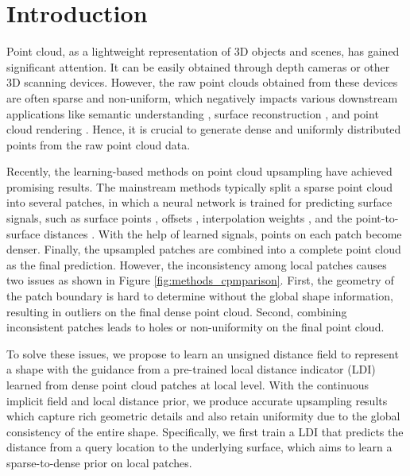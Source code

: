 \documentclass[letterpaper]{article} %
\begin{document}
\section{Introduction}
Point cloud, as a lightweight representation of 3D objects and scenes, has gained significant attention. It can be easily obtained through depth cameras or other 3D scanning devices. However, the raw point clouds obtained from these devices are often sparse and non-uniform, which negatively impacts various downstream applications like semantic understanding \cite{zhang2019review}, surface reconstruction \cite{chen2023unsupervised}, and point cloud rendering \cite{dai2020neural}. Hence, it is crucial to generate dense and uniformly distributed points from the raw point cloud data.


Recently, the learning-based methods on point cloud upsampling have achieved promising results. The mainstream methods typically split a sparse point cloud into several patches, in which a neural network is trained for predicting surface signals, such as surface points \cite{yu2018pu, li2019pu, qian2021pu, feng2022neural}, offsets \cite{li2021point}, interpolation weights \cite{luo2021pu, qian2021deep}, and the point-to-surface distances \cite{he2023grad, zhao2023self}. With the help of learned signals, points on each patch become denser. Finally, the upsampled patches are combined into a complete point cloud as the final prediction. However, the inconsistency among local patches causes two issues as shown in Figure \ref{fig:methods_cpmparison}. First, the geometry of the patch boundary is hard to determine without the global shape information, resulting in outliers on the final dense point cloud. Second, combining inconsistent patches leads to holes or non-uniformity on the final point cloud. 


To solve these issues, we propose to learn an unsigned distance field to represent a shape with the guidance from a pre-trained local distance indicator (LDI) learned from dense point cloud patches at local level. With the continuous implicit field and local distance prior, we produce accurate upsampling results which capture rich geometric details and also retain uniformity due to the global consistency of the entire shape. Specifically, we first train a LDI that predicts the distance from a query location to the underlying surface, which aims to learn a sparse-to-dense prior on local patches.
\end{document}
